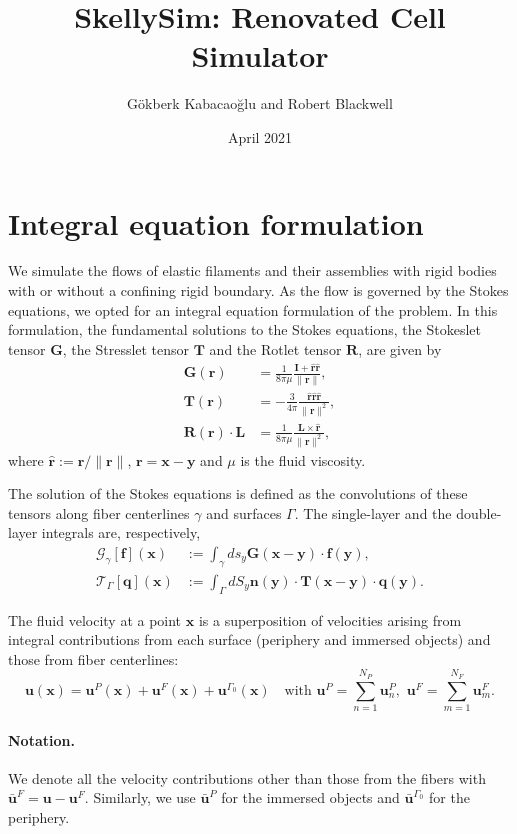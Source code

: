 \documentclass{article}
\title{SkellySim: Renovated Cell Simulator}
\author{G\"{o}kberk Kabacao\u{g}lu and Robert Blackwell}
\date{April 2021}
\newcommand{\uu}{\mathbf{u}}
\newcommand{\RR}{\mathbf{R}}
\newcommand{\TT}{\mathbf{T}}
\newcommand{\nn}{\mathbf{n}}
\newcommand{\xx}{\mathbf{x}}
\newcommand{\yy}{\mathbf{y}}
\newcommand{\qq}{\mathbf{q}}
\newcommand{\rr}{\mathbf{r}}
\newcommand{\rrhat}{\hat{\mathbf{r}}}
\newcommand{\ubarF}{\bar{\mathbf{u}}^F}
\newcommand{\uF}{{\mathbf{u}}^F}
\newcommand{\ubarP}{\bar{\mathbf{u}}^P}
\newcommand{\ubarG}{\bar{\mathbf{u}}^{\Gamma_0}}
\newcommand{\ff}{\mathbf{f}}
\newcommand{\GG}{\mathbf{G}}
\newcommand{\calG}{\mathcal{G}}
\newcommand{\calT}{\mathcal{T}}
\newcommand{\II}{\mathbf{I}}
\newcommand{\LL}{\mathbf{L}}
\begin{document}
\maketitle

\section{Integral equation formulation}
We simulate the flows of elastic filaments and their assemblies with rigid bodies with or without a confining rigid boundary. As the flow is governed by the Stokes equations, we opted for an integral equation formulation of the problem. In this formulation, the fundamental solutions to the Stokes equations, the Stokeslet tensor $\GG$, the Stresslet tensor $\TT$ and the Rotlet tensor $\RR$, are given by
\begin{align}
    \GG(\rr) & = \frac{1}{8\pi \mu} \frac{\II + \rrhat\rrhat}{\| \rr \|}, \\
    \TT(\rr) & = -\frac{3}{4\pi}\frac{\rrhat \rrhat \rrhat}{\| \rr \|^2}, \\
    \RR(\rr)\cdot \LL & = \frac{1}{8 \pi \mu} \frac{\LL \times \rrhat}{\|\rr\|^2},
\end{align}
where $\rrhat := \rr / \|\rr\|$, $\rr = \xx - \yy$ and $\mu$ is the fluid viscosity.

The solution of the Stokes equations is defined as the convolutions of these tensors along fiber centerlines $\gamma$ and surfaces $\Gamma$. The single-layer and the double-layer integrals are, respectively,
\begin{align}
    \calG_{\gamma}[\ff](\xx) & := \int_{\gamma} ds_{y} \GG(\xx-\yy) \cdot \ff(\yy),\\
    \calT_{\Gamma}[\qq](\xx) & := \int_{\Gamma} dS_{y} \nn(\yy) \cdot \TT (\xx-\yy) \cdot \qq(\yy).
\end{align}

The fluid velocity at a point $\xx$ is a superposition of velocities arising from integral contributions from each surface (periphery and immersed objects) and those from fiber centerlines:
\begin{equation}
    \uu(\xx) = \uu^P(\xx) + \uu^F(\xx) + \uu^{\Gamma_0}(\xx) \quad \text{with} \,\, \uu^P = \sum_{n = 1}^{N_P} \uu_n^P, \,\, \uu^F = \sum_{m=1}^{N_F} \uu_m^F.
\end{equation}

\paragraph*{Notation.} We denote all the velocity contributions other than those from the fibers with $\ubarF = \uu - \uF$. Similarly, we use $\ubarP$ for the immersed objects and $\ubarG$ for the periphery.
\end{document}
